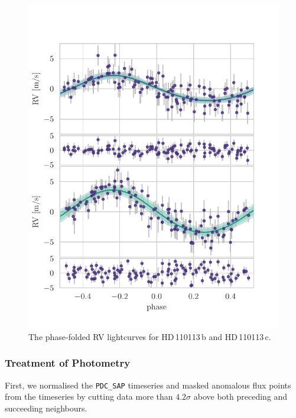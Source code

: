 \documentclass[fleqn,usenatbib]{mnras}
\newcommand{\Tplanet}{HD\,110113\,b}
\newcommand{\Tplanetc}{HD\,110113\,c}
\begin{document}
\begin{figure}
	\includegraphics[width=\columnwidth, trim={0.1cm 0.8cm 1.0cm 0.85cm}]{Phase_folded_RV_plots_3_GPs_nontransiting_c.pdf}
    \caption{The phase-folded RV lightcurves for \Tplanet{} and \Tplanetc{}.}
    \label{fig:phase_fold_rvs}
\end{figure}

\subsubsection{Treatment of Photometry}
First, we normalised the \texttt{PDC\_SAP} timeseries and masked anomalous flux points from the timeseries by cutting data more than $4.2\sigma$ above both preceding and succeeding neighbours.
\end{document}
